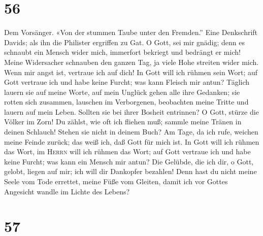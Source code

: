 \hypertarget{section-55}{%
\section{56}\label{section-55}}

 Dem Vorsänger. «Von der stummen Taube unter den
Fremden.'' Eine Denkschrift Davids; als ihn die Philister ergriffen zu
Gat. O Gott, sei mir gnädig; denn es schnaubt ein Mensch wider mich,
immerfort bekriegt und bedrängt er mich!  Meine
Widersacher schnauben den ganzen Tag, ja viele Hohe streiten wider mich.
 Wenn mir angst ist, vertraue ich auf dich! 
In Gott will ich rühmen sein Wort; auf Gott vertraue ich und habe keine
Furcht; was kann Fleisch mir antun?  Täglich lauern sie
auf meine Worte, auf mein Unglück gehen alle ihre Gedanken;
 sie rotten sich zusammen, lauschen im Verborgenen,
beobachten meine Tritte und lauern auf mein Leben. 
Sollten sie bei ihrer Bosheit entrinnen? O Gott, stürze die Völker im
Zorn!  Du zählst, wie oft ich fliehen muß; sammle meine
Tränen in deinen Schlauch! Stehen sie nicht in deinem Buch?
 Am Tage, da ich rufe, weichen meine Feinde zurück; das
weiß ich, daß Gott für mich ist.  In Gott will ich rühmen
das Wort, im \textsc{Herrn} will ich rühmen das Wort; 
auf Gott vertraue ich und habe keine Furcht; was kann ein Mensch mir
antun?  Die Gelübde, die ich dir, o Gott, gelobt, liegen
auf mir; ich will dir Dankopfer bezahlen!  Denn hast du
nicht meine Seele vom Tode errettet, meine Füße vom Gleiten, damit ich
vor Gottes Angesicht wandle im Lichte des Lebens?

\hypertarget{section-56}{%
\section{57}\label{section-56}}

